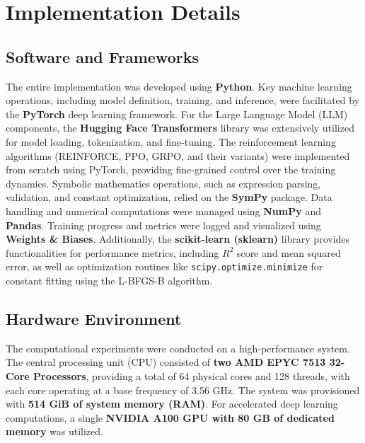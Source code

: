     \section{Implementation Details}

    \subsection{Software and Frameworks}
    The entire implementation was developed using \textbf{Python}. Key machine learning operations, including model definition, training, and inference, were facilitated by the \textbf{PyTorch} deep learning framework. For the Large Language Model (LLM) components, the \textbf{Hugging Face Transformers} library was extensively utilized for model loading, tokenization, and fine-tuning. The reinforcement learning algorithms (REINFORCE, PPO, GRPO, and their variants) were implemented from scratch using PyTorch, providing fine-grained control over the training dynamics. Symbolic mathematics operations, such as expression parsing, validation, and constant optimization, relied on the \textbf{SymPy} package. Data handling and numerical computations were managed using \textbf{NumPy} and \textbf{Pandas}. Training progress and metrics were logged and visualized using \textbf{Weights \& Biases}. Additionally, the \textbf{scikit-learn (sklearn)} library provides functionalities for performance metrics, including $R^2$ score and mean squared error, as well as optimization routines like \texttt{scipy.optimize.minimize} for constant fitting using the L-BFGS-B algorithm.
    
    \subsection{Hardware Environment}
    The computational experiments were conducted on a high-performance system. The central processing unit (CPU) consisted of \textbf{two AMD EPYC 7513 32-Core Processors}, providing a total of 64 physical cores and 128 threads, with each core operating at a base frequency of 3.56 GHz. The system was provisioned with \textbf{514 GiB of system memory (RAM)}. For accelerated deep learning computations, a single \textbf{NVIDIA A100 GPU with 80 GB of dedicated memory} was utilized.